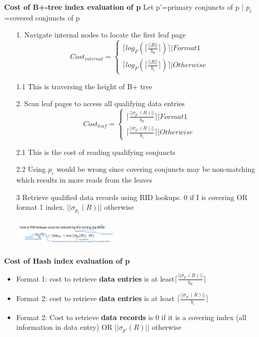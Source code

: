 \documentclass[10pt, landscape]{article}
\newcommand{\ceil}[1]{\lceil #1 \rceil}
\begin{document}
\begin{multicols}{4}
\textbf{Cost of B+-tree index evaluation of p} \newline
Let p'=primary conjuncts of p | $p_c$=covered conjuncts of p \newline
\begin{itemize}
  \item[1.] Navigate internal nodes to locate the first leaf page
  $$
  Cost_{internal} = \left\{
    \begin{array}{ll}
        \ceil{log_F(\ceil{\frac{||R||}{b_d}})} | Format 1 \\
        \ceil{log_F(\ceil{\frac{||R||}{b_i}})} | Otherwise
    \end{array}
\right.
  $$ \newline
  \item[1.1] This is traversing the height of B+ tree
  \item[2.] Scan leaf pages to access all qualifying data entries
  $$
  Cost_{leaf} = \left\{
    \begin{array}{ll}
        {\ceil{\frac{||\sigma_{p'}(R)||}{b_d}}} | Format 1 \\
        {\ceil{\frac{||\sigma_{p'}(R)||}{b_i}}} | Otherwise
    \end{array}
\right.
  $$ \newline
  \item[2.1] This is the cost of reading qualifying conjuncts
  \item[2.2] Using $p_c$ would be wrong since covering conjuncts may be non-matching which results in more reads from the leaves 
  \item[3] Retrieve qualified data records using RID lookups. 0 if I is covering OR format 1 index. $||\sigma_{p_c}(R)||$ otherwise
  \item[] \includegraphics[width=5cm, height=1.3cm]{optimisation.png}
\end{itemize}

\textbf{Cost of Hash index evaluation of p}
\begin{itemize}
  \item Format 1: cost to retrieve \textbf{data entries} is at least$\ceil{\frac{||\sigma_{p'}(R)||}{b_d}}$
  \item Format 2: cost to retrieve \textbf{data entries} is at least $\ceil{\frac{||\sigma_{p'}(R)||}{b_i}}$
  \item Format 2: Cost to retrieve \textbf{data records} is 0 if it is a covering index (all information in data entry) OR $||\sigma_{p'}(R)||$ otherwise
\end{itemize}


\end{multicols}
\end{document}
